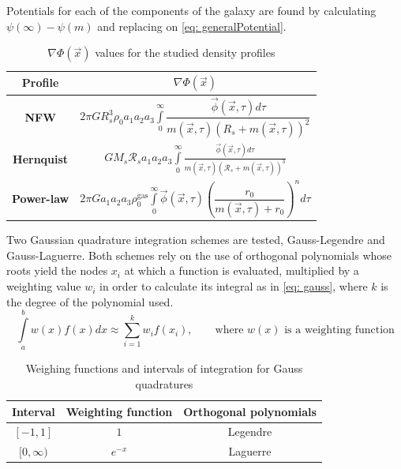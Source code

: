 		Potentials for each of the components of the galaxy are found by calculating $\psi(\infty) - \psi(m)$ and replacing on \autoref{eq: generalPotential}.
		
		
	
		\begin{table}[h]
			\centering
			\caption{$\nabla\Phi(\vec{x})$ values for the studied density profiles}
			\label{tb: gradients}
			\begin{tabular}{c|c}
				\hline
				\textbf{Profile} & $\nabla \Phi(\vec{x})$\\
				\hline
				\rule{0pt}{4ex}
				\textbf{NFW} & $2 \pi G R_{s}^{3}\rho_0 a_{1} a_{2} a_{3} \displaystyle\int\limits_{0}^{\infty}
				\dfrac{\vec{\phi}(\vec{x}, \tau) d\tau}{m(\vec{x}, \tau)\left(R_{s} + m(\vec{x}, \tau)\right)^{2}}$ \\
				\textbf{Hernquist} &  $G M_{s} \mathcal{R}_s a_{1} a_{2} a_{3} \displaystyle\int\limits_{0}^{\infty} \frac{ \vec{\phi}(\vec{x}, \tau) d\tau}{m(\vec{x}, \tau)\left(\mathcal{R}_s + m(\vec{x}, \tau)\right)^{3}}$ \\
				\textbf{Power-law} & $2 \pi G a_{1} a_{2} a_{3}  \rho_{0}^\text{gas}  \displaystyle\int\limits_{0}^{\infty}\vec{\phi}(\vec{x}, \tau)\left(\dfrac{r_{0}}{m(\vec{x}, \tau) + r_{0}}\right)^{n}d\tau$\\
				\hline
			\end{tabular}
			
		\end{table}	
		
		Two Gaussian quadrature integration schemes are tested, Gauss-Legendre and Gauss-Laguerre. Both schemes rely on the use of orthogonal polynomials whose roots yield the nodes $x_i$ at which a function is evaluated, multiplied by a weighting value $w_i$ in order to calculate its integral as in \autoref{eq: gauss}, where $k$ is the degree of the polynomial used.
		\begin{equation}\label{eq: gauss}
			\int\limits_{a}^{b} w(x)f(x)dx \approx \sum_{i = 1}^{k}w_i f(x_i), \qquad \text{where $w(x)$ is a weighting function}
		\end{equation}
		
		\begin{table}[h]
			\centering
			\caption{Weighing functions and intervals of integration for Gauss quadratures}
			\begin{tabular}{ccc}
				\hline
				\textbf{Interval} & \textbf{Weighting function} & \textbf{Orthogonal polynomials} \\
				\hline
				$[-1, 1]$ & $1$ & Legendre \\
				$[0, \infty)$ & $e^{-x}$ & Laguerre \\
				\hline
			\end{tabular}
		\end{table}
		
